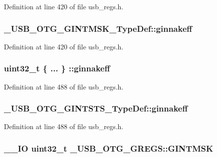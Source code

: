 Definition at line 420 of file usb\-\_\-regs.\-h.

\hypertarget{group___u_s_b___o_t_g___d_r_i_v_e_r_ga0b8ad750aae7a0c2e0a3027dbe3a8e59}{
\subsubsection[{ginnakeff}]{ \-\_\-\-U\-S\-B\-\_\-\-O\-T\-G\-\_\-\-G\-I\-N\-T\-M\-S\-K\-\_\-\-Type\-Def\-::ginnakeff}}\label{group___u_s_b___o_t_g___d_r_i_v_e_r_ga0b8ad750aae7a0c2e0a3027dbe3a8e59}


Definition at line 420 of file usb\-\_\-regs.\-h.

\hypertarget{group___u_s_b___o_t_g___d_r_i_v_e_r_ga2ce701c1c4cb07eb7d4e699b02e00c1a}{
\subsubsection[{ginnakeff}]{\setlength{\rightskip}{0pt plus 5cm}uint32\-\_\-t \{ ... \} \-::ginnakeff}}\label{group___u_s_b___o_t_g___d_r_i_v_e_r_ga2ce701c1c4cb07eb7d4e699b02e00c1a}


Definition at line 488 of file usb\-\_\-regs.\-h.

\hypertarget{group___u_s_b___o_t_g___d_r_i_v_e_r_gaa5f3025af7ef429aaf5284bc974f47bb}{
\subsubsection[{ginnakeff}]{ \-\_\-\-U\-S\-B\-\_\-\-O\-T\-G\-\_\-\-G\-I\-N\-T\-S\-T\-S\-\_\-\-Type\-Def\-::ginnakeff}}\label{group___u_s_b___o_t_g___d_r_i_v_e_r_gaa5f3025af7ef429aaf5284bc974f47bb}


Definition at line 488 of file usb\-\_\-regs.\-h.

\hypertarget{group___u_s_b___o_t_g___d_r_i_v_e_r_ga6f14e249d3ef50307a23c4ddc7f12368}{
\subsubsection[{G\-I\-N\-T\-M\-S\-K}]{\setlength{\rightskip}{0pt plus 5cm}\-\_\-\-\_\-\-I\-O {\bf uint32\-\_\-t} \-\_\-\-U\-S\-B\-\_\-\-O\-T\-G\-\_\-\-G\-R\-E\-G\-S\-::\-G\-I\-N\-T\-M\-S\-K}}\label{group___u_s_b___o_t_g___d_r_i_v_e_r_ga6f14e249d3ef50307a23c4ddc7f12368}


